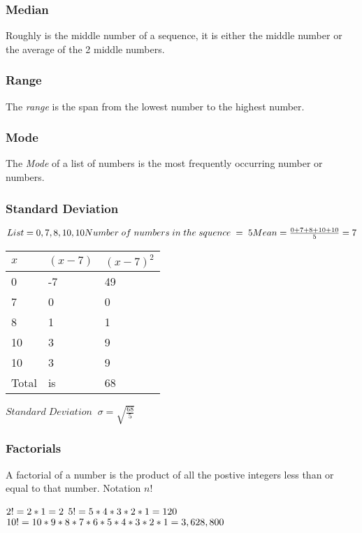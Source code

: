 \documentclass{article}
\begin{document}
\subsubsection{Median}
Roughly is the middle number of a sequence, it is either the middle number or the average of the 2 middle numbers.

\subsubsection{Range}
The \textit{range} is the span from the lowest number to the highest number.

\subsubsection{Mode}
The \textit{Mode} of a list of numbers is the most frequently occurring number or numbers.

\subsubsection{Standard Deviation} 


$
List =  0, 7, 8 , 10, 10 
\\
Number\; of\; numbers\; in\; the\; squence\; =\; 5
\\
Mean = \frac{0 + 7 + 8 + 10 + 10}{5} =  7
\\$



\begin{tabular}{l|ll}
$x$ & $(x - 7)$ & $(x -7)^{2}$  \\
\hline
0 & -7 & 49  \\
7 & 0 &  0 \\
8 & 1 & 1  \\
10 & 3 & 9  \\
10 & 3 & 9  \\
\hline

Total & is & 68  \\
\end{tabular}


$Standard\;Deviation \;\; \sigma = \sqrt{\frac{68}{5}}$

\newpage
\subsubsection{Factorials}
A factorial of a number is the product of all the postive integers less than or equal to that number.
Notation $n!$

$\\ 2! = 2 * 1 = 2 \\$
$ 5! = 5 * 4 * 3 * 2 * 1 = 120\\ $
$ 10! = 10 * 9 * 8 * 7 * 6 * 5 * 4 * 3 * 2 * 1 = 3,628,800 \\$
\end{document}

